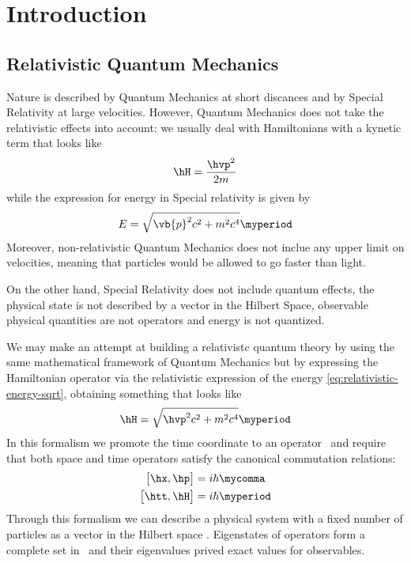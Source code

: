 \chapter{Introduction}
    \section{Relativistic Quantum Mechanics}
        Nature is described by Quantum Mechanics at short discances and by Special Relativity at large velocities. However, Quantum Mechanics does not take the relativistic effects into account: we usually deal with Hamiltonians with a kynetic term that looks like
        \begin{equation}
            \label{eq:Hamiltonian-p2-2m}
            \hH = \frac{\hvp^2}{2m}
        \end{equation}
        while the expression for energy in Special relativity is given by 
        \begin{equation}
            \label{eq:relativistic-energy-sqrt}
            E = \sqrt{\vb{p}^2 c^2 + m^2 c^4}
            \myperiod
        \end{equation}
        Moreover, non-relativistic Quantum Mechanics does not inclue any upper limit on velocities, meaning that particles would be allowed to go faster than light.

        On the other hand, Special Relativity does not include quantum effects, the physical state is not described by a vector in the Hilbert Space, observable physical quantities are not operators and energy is not quantized.

        We may make an attempt at building a relativistc quantum theory by using the same mathematical framework of Quantum Mechanics but by expressing the Hamiltonian operator via the relativistic expression of the energy \eqref{eq:relativistic-energy-sqrt}, obtaining something that looks like
        \begin{equation}
            \label{eq:relativistic-Hamiltonian}
            \hH = \sqrt{\hvp^2 c^2 + m^2 c^4}
            \myperiod
        \end{equation}
        In this formalism we promote the time coordinate to an operator \htt\ and require that both space and time operators satisfy the canonical commutation relations:
        \begin{align}
            \bigl[\hx, \hp \bigr] &= i\hbar
            \mycomma\\
            \bigl[\htt, \hH \bigr] &= i\hbar
            \myperiod
        \end{align}
        Through this formalism we can describe a physical system with a fixed number of particles as a vector in the Hilbert space \msH. Eigenstates of operators form a complete set in \msH\ and their eigenvalues prived exact values for observables.

